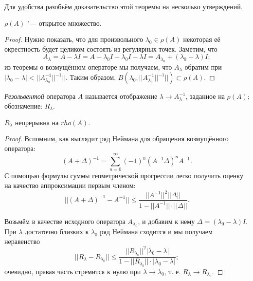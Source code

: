 \documentclass[main]{subfiles}
\begin{document}
Для удобства разобьём доказательство
этой теоремы на несколько утверждений.


\setcounter{proposition}{-1}
\begin{proposition} %
  \( \rho(A) \) "--- открытое множество.
\end{proposition}
\begin{proof}
  Нужно показать, что для произвольного
  \( \lambda_0 \in \rho(A) \) некоторая её
  окрестность будет целиком состоять
  из регулярных точек.
  Заметим, что
  \[
    A_\lambda = A - \lambda I =
    A - \lambda_0 I + \lambda_0 I - \lambda I =
    A_{\lambda_0} + (\lambda_0 - \lambda) I;
  \]
  из теоремы о возмущённом операторе мы получаем,
  что \( A_\lambda \) обратим при
  \( |\lambda_0 - \lambda| < ||A_{\lambda_0}^{-1}||^{-1}|| \).
  Таким образом,
  \( B(\lambda_0, ||A_{\lambda_0}^{-1}||^{-1}||) \subset \rho(A) \).
\end{proof}

%

\begin{definition}
  \emph{Резольвентой} оператора \( A \) называется
  отображение \( \lambda \to A_\lambda^{-1} \),
  заданное на \( \rho(A) \); обозначение: \( R_\lambda \).
\end{definition}

\begin{proposition} %
  \( R_\lambda \) непрерывна на \( rho(A) \).
\end{proposition}
\begin{proof}
  Вспомним, как выглядит ряд Неймана
  для обращения возмущённого оператора:
  \[
    (A + \Delta)^{-1} = \sum_{n=0}^\infty (-1)^n (A^{-1} \Delta)^n A^{-1}.
  \]
  С помощью формулы суммы геометрической прогрессии
  легко получить оценку на качество аппроксимации первым членом:
  \[
    ||(A + \Delta)^{-1} - A^{-1}|| \le \frac{||A^{-1}||^2 ||\Delta||}
    {1 - ||A^{-1}|| \cdot ||\Delta||}.
  \]

  Возьмём в качестве исходного оператора \( A_{\lambda_0} \),
  и добавим к нему \( \Delta = (\lambda_0 - \lambda) I \).
  При \( \lambda \) достаточно близких к \( \lambda_0 \)
  ряд Неймана сходится и мы получаем неравенство
  \[
    ||R_\lambda - R_{\lambda_0}|| \le
    \frac{||R_{\lambda_0}||^2 |\lambda_0 - \lambda|}
    {1 - ||R_{\lambda_0}|| \cdot |\lambda_0 - \lambda|};
  \]
  очевидно, правая часть стремится к нулю при
  \( \lambda \to \lambda_0 \), т. е.
  \( R_\lambda \to R_{\lambda_0} \).
\end{proof}
\end{document}
